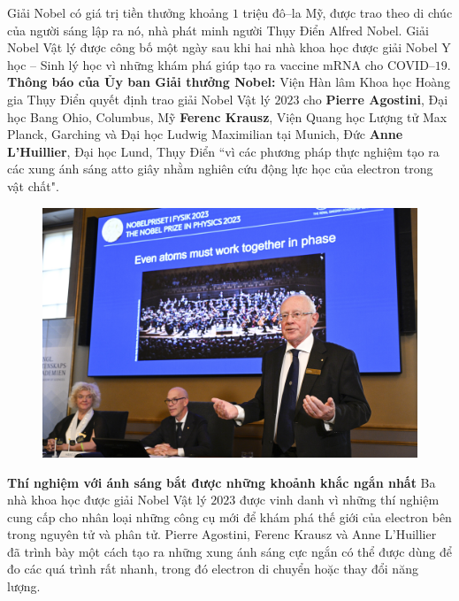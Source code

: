 \begin{multicols}{2}
\begin{figure}[H]
		\vspace*{-15pt}
	\end{figure}
	Giải Nobel có giá trị tiền thưởng khoảng $1$ triệu đô--la Mỹ, được trao theo di chúc của người sáng lập ra nó, nhà phát minh người Thụy Điển Alfred Nobel.
	\vskip 0.1cm
	Giải Nobel Vật lý được công bố một ngày sau khi hai nhà khoa học được giải Nobel Y học -- Sinh lý học vì những khám phá giúp tạo ra vaccine mRNA cho COVID--$19$.
	\vskip 0.1cm
	\textbf{\color{timhieukhoahoc}Thông báo của Ủy ban Giải thưởng Nobel:}
	\vskip 0.1cm
	Viện Hàn lâm Khoa học Hoàng gia Thụy Điển quyết định trao giải Nobel Vật lý $2023$ cho
	\vskip 0.1cm
	\textbf{\color{timhieukhoahoc}Pierre Agostini}, Đại học Bang Ohio, Columbus, Mỹ
	\vskip 0.1cm
	\textbf{\color{timhieukhoahoc}Ferenc Krausz},  Viện Quang học Lượng tử Max Planck, Garching và Đại học Ludwig Maximilian tại Munich, Đức
	\vskip 0.1cm
	\textbf{\color{timhieukhoahoc}Anne L'Huillier}, Đại học Lund, Thụy Điển
	\vskip 0.1cm
	``vì các phương pháp thực nghiệm tạo ra các xung ánh sáng atto giây nhằm nghiên cứu động lực học của electron trong vật chất".
	\begin{figure}[H]
		\vspace*{-5pt}
		\centering
		\captionsetup{labelformat= empty, justification=centering}
		\includegraphics[width= 1\linewidth]{9}
		\vspace*{-15pt}
	\end{figure}
	\textbf{\color{timhieukhoahoc}Thí nghiệm với ánh sáng bắt được những khoảnh khắc ngắn nhất}
	\vskip 0.1cm
	Ba nhà khoa học được giải Nobel Vật lý $2023$ được vinh danh vì những thí nghiệm cung cấp cho nhân loại những công cụ mới để khám phá thế giới của electron bên trong nguyên tử và phân tử. Pierre Agostini, Ferenc Krausz và Anne L'Huillier đã trình bày một cách tạo ra những xung ánh sáng cực ngắn có thể được dùng để đo các quá trình rất nhanh, trong đó electron di chuyển hoặc thay đổi năng lượng.

\end{multicols}
